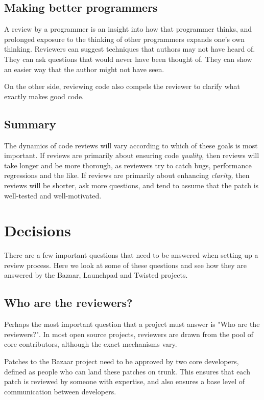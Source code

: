 \documentclass{article}
\begin{document}
\subsection{Making better programmers}

A review by a programmer is an insight into how that programmer thinks, and prolonged exposure to the thinking of other programmers expands one's own thinking. Reviewers can suggest techniques that authors may not have heard of. They can ask questions that would never have been thought of. They can show an easier way that the author might not have seen.

On the other side, reviewing code also compels the reviewer to clarify what exactly makes good code. 

\subsection{Summary}

The dynamics of code reviews will vary according to which of these goals is most important. If reviews are primarily about ensuring code {\it quality,} then reviews will take longer and be more thorough, as reviewers try to catch bugs, performance regressions and the like. If reviews are primarily about enhancing {\it clarity,} then reviews will be shorter, ask more questions, and tend to assume that the patch is well-tested and well-motivated. 


\section{Decisions}

There are a few important questions that need to be answered when setting up a review process. Here we look at some of these questions and see how they are answered by the Bazaar, Launchpad and Twisted projects.


\subsection{Who are the reviewers?}

Perhaps the most important question that a project must answer is "Who are the reviewers?". In most open source projects, reviewers are drawn from the pool of core contributors, although the exact mechanisms vary.

Patches to the Bazaar project need to be approved by two core developers, defined as people who can land these patches on trunk. This ensures that each patch is reviewed by someone with expertise, and also ensures a base level of communication between developers.
\end{document}
